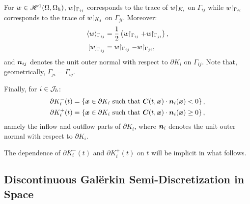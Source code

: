 For $w \in \mathscr{H}^{1}(\Omega, \Omega_h)$, $w \!\!\restriction_{\Gamma_{ij}}$ corresponds to the trace of $w \!\!\restriction_{K_i}$ on $\Gamma_{ij}$ while $w \!\!\restriction_{\Gamma_{ji}}$ corresponds to the trace of $w \!\!\restriction_{K_j}$ on $\Gamma_{ji}$. Moreover:
\begin{align}
    \langle w \rangle_{\Gamma_{ij}} &= \frac{1}{2} \left( w \Restriction_{\Gamma_{ij}} + w \Restriction_{\Gamma_{ji}} \right), \\
    \left[ w \right]_{\Gamma_{ij}} &= w \Restriction_{\Gamma_{ij}} - w \Restriction_{\Gamma_{ji}},
\end{align}
and $\bm{n}_{ij}$ denotes the unit outer normal with respect to $\partial K_i$ on $\Gamma_{ij}$. Note that, geometrically, $\Gamma_{ji} = \Gamma_{ij}$.

Finally, for $i \in \mathcal{J}_h$:
\begin{align}
    \partial K_i^-(t) = \left\{ \bm{x} \in \partial K_i \text{ such that } \bm{C}(t, \bm{x}) \cdot \bm{n}_i(\bm{x}) < 0 \right\}, \\
    \partial K_i^+(t) = \left\{ \bm{x} \in \partial K_i \text{ such that } \bm{C}(t, \bm{x}) \cdot \bm{n}_i(\bm{x}) \geq 0 \right\},
\end{align}
namely the inflow and outflow parts of $\partial K_i$, where $\bm{n}_i$ denotes the unit outer normal with respect to $\partial K_i$.

The dependence of $\partial K_i^-(t)$ and $\partial K_i^+(t)$ on $t$ will be implicit in what follows.

\newpage
\subsection{Discontinuous Galërkin Semi-Discretization in Space} \label{sec:space_discretization}

